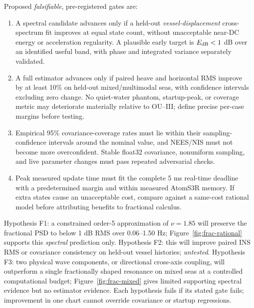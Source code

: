 Proposed \emph{falsifiable}, pre-registered gates are:
\begin{enumerate}
\item A spectral candidate advances only if a held-out
\emph{vessel-displacement} cross-spectrum fit improves at
equal state count, without unacceptable near-DC energy or
acceleration regularity. A plausible early target is
\(E_{\rm dB}<1\) dB over an identified useful band, with
phase and integrated variance separately validated.
\item A full estimator advances only if paired heave and
horizontal RMS improve by at least 10\% on held-out
mixed/multimodal seas, with confidence intervals excluding
zero change. No quiet-water phantom, startup-peak, or
coverage metric may deteriorate materially relative to
OU--III; define precise per-case margins before testing.
\item Empirical 95\% covariance-coverage rates must lie
within their sampling-confidence intervals around the
nominal value, and NEES/NIS must not become more
overconfident. Stable float32 covariance, nonuniform
sampling, and live parameter changes must pass repeated
adversarial checks.
\item Peak measured update time must fit the complete
5 ms real-time deadline with a predetermined margin and
within measured AtomS3R memory. If extra states cause an
unacceptable cost, compare against a same-cost rational
model before attributing benefits to fractional calculus.
\end{enumerate}
Hypothesis F1: a constrained order-5 approximation of
\(\nu=1.85\) will preserve the fractional PSD to below
1 dB RMS over 0.06--1.50 Hz; Figure~\ref{fig:frac-rational}
supports this \emph{spectral} prediction only.
Hypothesis F2: this will improve paired INS RMS or covariance
consistency on held-out vessel histories; \emph{untested}.
Hypothesis F3: two physical wave components, or directional
cross-axis coupling, will outperform a single fractionally shaped
resonance on mixed seas at a controlled computational budget;
Figure~\ref{fig:frac-mixed} gives limited supporting spectral
evidence but no estimator evidence.
Each hypothesis fails if its stated gate fails; improvement in one
chart cannot override covariance or startup regressions.

